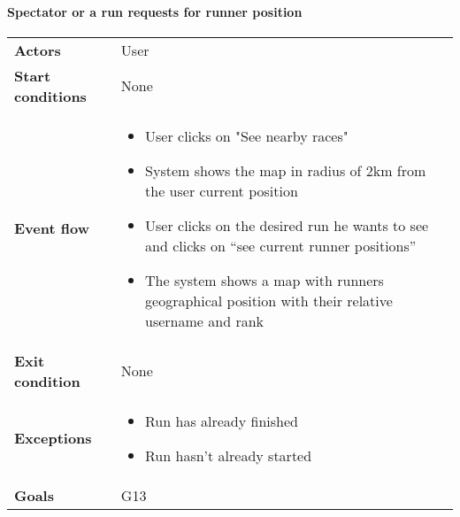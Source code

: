 \paragraph{Spectator or a run requests for runner position}
\begin{center}
\begin{table}[H]
\centering
\begin{tabular}{l|l}
\textbf{Actors} & User \\
\textbf{Start conditions} & None \\
\textbf{Event flow}  & \begin{minipage}[t]{0.7\textwidth}
    \begin{itemize}
       \item User clicks on "See nearby races"
\item System shows the map in radius of 2km from the user current position
\item User clicks on the desired run he wants to see and clicks on “see current runner positions”
\item The system shows a map with runners geographical position with their relative username and rank


    \end{itemize}
    
\end{minipage}  \\
\textbf{Exit condition} & None \\
\textbf{Exceptions} & \begin{minipage}[t]{0.7\textwidth}
    \begin{itemize}
       \item Run has already finished
\item Run hasn’t already started


    \end{itemize}
    
\end{minipage}  \\
\textbf{Goals} & G13 
\end{tabular}

\end{table}
\end{center}